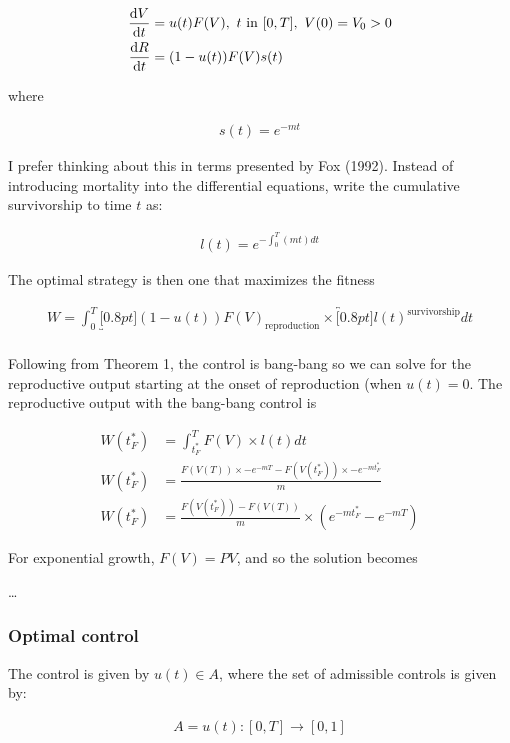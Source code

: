\documentclass[12pt, oneside]{article}   	%
\begin{document}
\begin{align}
\dv{V}{t} & = u(t) F(V),\ t\mathrm{\ in\ }[0,T],\ V(0)=V_0>0  \\
\dv{R}{t} & = (1-u(t)) F(V) s(t)
\end{align}

where 

\begin{align}
s(t) = e^{-mt}
\end{align}

I prefer thinking about this in terms presented by Fox (1992). Instead of introducing mortality into the differential equations, write the cumulative survivorship to time $t$ as:

\begin{align}
l(t) = e^{-\int_0^T (mt) dt}
\end{align}

The optimal strategy is then one that maximizes the fitness

\begin{align}
W =  \int_0^T \underbracket[0.8pt]{(1-u(t)) F(V)}_{\text{reproduction} } \times \overbracket[0.8pt]{l(t)}^{\text{survivorship}} dt  \nonumber \\
\end{align}

Following from Theorem 1, the control is bang-bang so we can solve for the reproductive output starting at the onset of reproduction (when $u(t) = 0$. The reproductive output with the bang-bang control is

\begin{align}
W(t^*_F) & =  \int_{t^*_F}^T  F(V) \times l(t) dt  \nonumber \\
W(t^*_F) & =  \frac{F(V(T))\times -e^{-mT} - F(V({t^*_F})) \times -e^{-m{t^*_F}}}{m} \nonumber \\
W(t^*_F) & =  \frac{ F(V({t^*_F})) - F(V(T)) }{m} \times (e^{-m{t^*_F}} - e^{-mT} )
\end{align}

For exponential growth, $F(V) = PV$, and so the solution becomes 

\dots

\subsubsection{Optimal control}

The control is given by $u(t) \in A$, where the set of admissible controls is given by:

\begin{align}
A = {u(t): [0,T]  \rightarrow [0,1] } \nonumber \\
\end{align}
\end{document}

